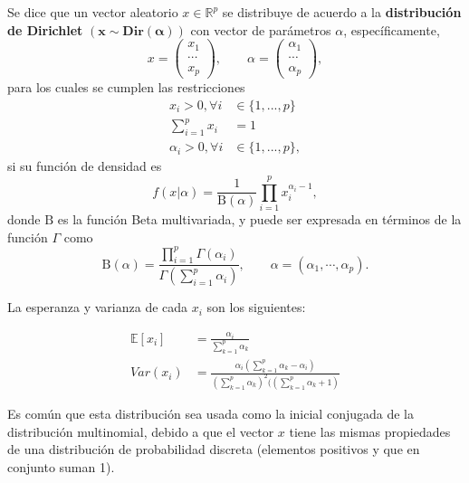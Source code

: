 \begin{defin}
    Se dice que un vector aleatorio $x \in \mathbb{R}^p$ se distribuye de acuerdo a la \textbf{distribuci\'on de Dirichlet}  $\mathbf{(x \sim Dir(\alpha))}$ con vector de par\'ametros $\alpha$, espec\'ificamente,
    \begin{equation*}
        x = 
        \left(\begin{array}{c}
            x_1  \\
            \cdots \\
            x_p
        \end{array}\right),
        \qquad
        \alpha = 
        \left(\begin{array}{c}
            \alpha_1  \\
            \cdots \\
            \alpha_p
        \end{array}\right),
    \end{equation*}
    para los cuales se cumplen las restricciones
    \begin{equation*}
    \begin{aligned}
        x_i > 0, \forall i &\in \{1,...,p\} \\
        \sum_{i=1}^p x_i &= 1 \\
        \alpha_i > 0, \forall i &\in \{1,...,p\},
    \end{aligned}
    \end{equation*}
    si su funci\'on de densidad  es
    \begin{equation*}
        f(x|\alpha) = 
        \frac {1}{\mathrm {B} (\alpha)}
        \prod _{i=1}^{p}x_{i}^{\alpha _{i}-1},
    \end{equation*}
    donde $\mathrm{B}$ es la funci\'on Beta multivariada, y puede ser expresada en t\'erminos de la funci\'on $\Gamma$ como 
    \begin{equation*}
       \mathrm{B}(\alpha)=
       \frac {\prod _{i=1}^{p}\Gamma (\alpha _{i})}
       {\Gamma \left(\sum _{i=1}^{p}\alpha _{i}\right)},
       \qquad 
       \alpha =(\alpha _1,\cdots ,\alpha _p). 
    \end{equation*}
    
    La esperanza y varianza de cada $x_i$ son los siguientes:
    
    \begin{equation*}
    \begin{aligned}
        \mathbb{E}[x_i] &= \frac{\alpha_i}{\sum_{k=1}^p \alpha_k} \\
        Var(x_i) &= \frac
        {\alpha_i \left( \sum_{k=1}^p \alpha_k - \alpha_i \right)}
        {\left( \sum_{k=1}^p \alpha_k \right)^2 (\left( \sum_{k=1}^p \alpha_k + 1 \right)}
    \end{aligned}
    \end{equation*}
    
\end{defin}
Es com\'un que esta distribuci\'on sea usada como la inicial conjugada de la distribuci\'on multinomial, debido a que el vector $x$ tiene las mismas propiedades de una distribuci\'on de probabilidad discreta (elementos positivos y que en conjunto suman 1).

